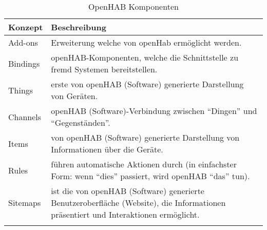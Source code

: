 \begin{longtable}{| p{2cm} | p{13cm}|}
	\hline
	\textbf{Konzept} & \textbf{Beschreibung} \\
	\hline \hline
	\centering Add-ons & Erweiterung welche von openHab ermöglicht werden. \\
	\hline
	\centering Bindings & openHAB-Komponenten, welche die Schnittstelle zu fremd Systemen bereitstellen.  \\
	\hline
	\centering Things & erste von openHAB (Software) generierte Darstellung von Geräten. \\
	\hline
	\centering Channels & openHAB (Software)-Verbindung zwischen "`Dingen"' und "`Gegenständen"'. \\
	\hline
	\centering Items & von openHAB (Software) generierte Darstellung von Informationen über die Geräte.\\
	\hline
	\centering Rules & führen automatische Aktionen durch (in einfachster Form: wenn "`dies"' passiert, wird openHAB "`das"' tun).\\
	\hline
	\centering Sitemaps & ist die von openHAB (Software) generierte Benutzeroberfläche (Website), die Informationen präsentiert und Interaktionen ermöglicht.\\
	\hline
	\caption{OpenHAB Komponenten}
	\label{table:openhub-components}
\end{longtable}

